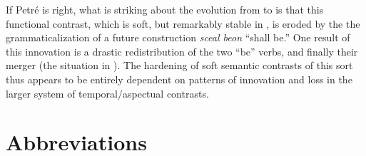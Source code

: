 \documentclass[output=paper,hidelinks]{langscibook}
\begin{document}
\begin{exe}
\begin{xlist}
\begin{xlist}
\begin{exe}
\begin{exe}
\begin{exe}
\begin{exe}
\begin{xlist}
\begin{exe}
\begin{xlist}
\begin{exe}
\begin{xlist}
If Petr\'{e} is right, what is striking about the evolution from  to  is that this functional contrast, which is soft, but remarkably stable in , is eroded by the the grammaticalization of a future construction \textit{sceal beon} ``shall be.'' One result of this innovation is a drastic redistribution of the two ``be'' verbs, and finally their merger (the situation in ). The hardening of soft semantic contrasts of this sort thus appears to be entirely dependent on patterns of innovation and loss in the larger system of temporal/aspectual contrasts.\newpage

\section*{Abbreviations}


\end{xlist}
\end{exe}
\end{xlist}
\end{exe}
\end{xlist}
\end{exe}
\end{exe}
\end{exe}
\end{exe}
\end{xlist}
\end{xlist}
\end{exe}
\end{document}
